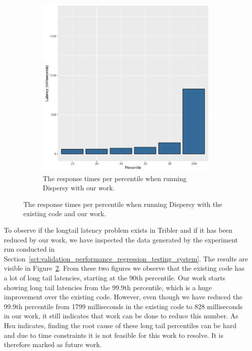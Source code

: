 \begin{figure}[h]
\begin{subfigure}[b]{.5\linewidth}
		\includegraphics[width=\textwidth]{experimentation/images/response_time_percentiles_async}
		\caption{The response times per percentile when running Dispersy with our work.}
		\label{fig:response_times_percentiles_async}
	\end{subfigure}
	\caption{The response times per percentile when running Dispersy with the existing code and our work.}
	\label{fig:resposne_times_percentiles}
\end{figure}

To observe if the longtail latency problem exists in Tribler and if it has been reduced by our work, we have inspected the data generated by the experiment run conducted in Section~\ref{sct:validation_performance_regression_testing_system}.
The results are visible in Figure~\ref{fig:resposne_times_percentiles}.
From these two figures we observe that the existing code has a lot of long tail latencies, starting at the 90th percentile.
Our work starts showing long tail latencies from the 99.9th percentile, which is a huge improvement over the existing code.
However, even though we have reduced the 99.9th percentile from 1799 milliseconds in the existing code to 828 milliseconds in our work, it still indicates that work can be done to reduce this number.
As Hsu indicates, finding the root cause of these long tail percentiles can be hard and due to time constraints it is not feasible for this work to resolve.
It is therefore marked as future work.

